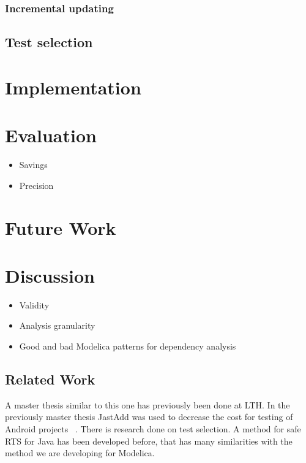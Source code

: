 \documentclass{cslthse-msc}
\begin{document}
\subsection{Incremental updating}

\section{Test selection}
\chapter[Implementation]{Implementation}
\chapter[Evaluation]{Evaluation}
\begin{itemize}
	\item Savings
	\item Precision
\end{itemize}

\chapter[Future Work]{Future Work}
	
\chapter[Discussion]{Discussion}



\begin{itemize}
	\item Validity
	\item Analysis granularity
    \item Good and bad Modelica patterns for dependency analysis
\end{itemize}

\section{Related Work}

A master thesis similar to this one has previously been done at LTH. In the previously master thesis JastAdd was used to decrease the cost for testing of Android projects ~\cite{kampe2012dependroid}. There is research done on test selection. A method for safe RTS for Java has been developed before, that has many similarities with the method we are developing for Modelica. 
\end{document}
